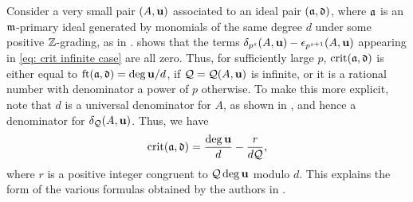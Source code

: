 \documentclass{amsart}
\begin{document}
\begin{remark}
   Consider a very small pair $(A,\mathbf{u})$ associated to an ideal pair $(\mathfrak{a},\mathfrak{d})$, where $\mathfrak{a}$ is an $\mathfrak{m}$-primary ideal generated by monomials of the same degree $d$ under some positive $\mathbb{Z}$-grading, as in .
    shows that the terms $\delta_{p^s}(A,\mathbf{u})-\epsilon_{p^{s+1}}(A,\mathbf{u})$ appearing in \eqref{eq: crit infinite case} are all zero.
   Thus, for sufficiently large $p$, $\operatorname{crit}(\mathfrak{a},\mathfrak{d})$ is either equal to $\operatorname{ft}(\mathfrak{a}, \mathfrak{d}) = \deg \mathbf{u}/d$, if $\mathcal{Q}=\mathcal{Q}(A,\mathbf{u})$ is infinite, or it is a rational number with denominator a power of $p$ otherwise.
   To make this more explicit, note that $d$ is a universal denominator for $A$, as shown in , and hence a denominator for $\delta_{\mathcal{Q}}(A,\mathbf{u})$.
   Thus, we have
   \[\operatorname{crit}(\mathfrak{a},\mathfrak{d}) = \frac{\deg \mathbf{u}}{d} - \frac{r}{d\mathcal{Q}},\]
   where $r$ is a positive integer congruent to $\mathcal{Q}\deg\mathbf{u}$ modulo $d$.
   This explains the form of the various formulas obtained by the authors in \cite[Theorems~3.6, 4.8, and~5.5]{hernandez+etal.frobenius_examples}.
\end{remark}


\end{document}
